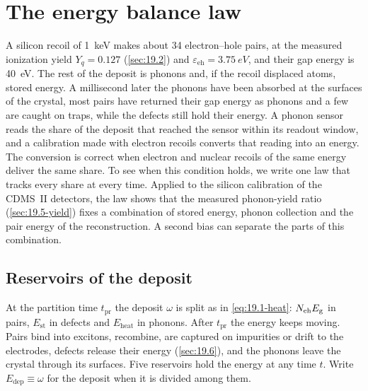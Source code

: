 \section{The energy balance law}\label{sec:19.5}

A silicon recoil of \SI{1}{keV} makes about 34 electron--hole pairs, at the measured ionization yield $Y_q = 0.127$ (\cref{sec:19.2}) and $\varepsilon_{\mathrm{eh}} = \SI{3.75}{eV}$, and their gap energy is \SI{40}{eV}. The rest of the deposit is phonons and, if the recoil displaced atoms, stored energy. A millisecond later the phonons have been absorbed at the surfaces of the crystal, most pairs have returned their gap energy as phonons and a few are caught on traps, while the defects still hold their energy. A phonon sensor reads the share of the deposit that reached the sensor within its readout window, and a calibration made with electron recoils converts that reading into an energy. The conversion is correct when electron and nuclear recoils of the same energy deliver the same share. To see when this condition holds, we write one law that tracks every share at every time. Applied to the silicon calibration of the CDMS~II detectors, the law shows that the measured phonon-yield ratio (\cref{sec:19.5-yield}) fixes a combination of stored energy, phonon collection and the pair energy of the reconstruction. A second bias can separate the parts of this combination.

\subsection{Reservoirs of the deposit}\label{sec:19.5-law}

At the partition time $t_{\mathrm{pr}}$ the deposit $\omega$ is split as in \cref{eq:19.1-heat}: $N_{\mathrm{eh}}E_{\mathrm{g}}$ in pairs, $E_{\mathrm{st}}$ in defects and $E_{\mathrm{heat}}$ in phonons. After $t_{\mathrm{pr}}$ the energy keeps moving. Pairs bind into excitons, recombine, are captured on impurities or drift to the electrodes, defects release their energy (\cref{sec:19.6}), and the phonons leave the crystal through its surfaces. Five reservoirs hold the energy at any time $t$. Write $E_{\mathrm{dep}} \equiv \omega$ for the deposit when it is divided among them.

